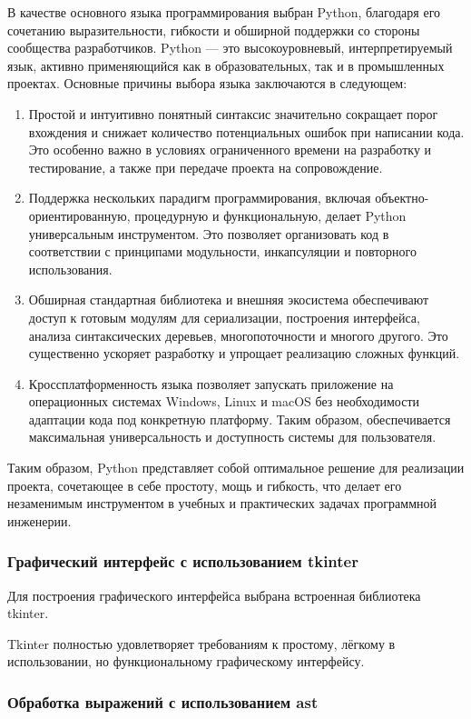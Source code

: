 В качестве основного языка программирования выбран Python, благодаря его сочетанию выразительности, гибкости и обширной поддержки со стороны сообщества разработчиков. Python — это высокоуровневый, интерпретируемый язык, активно применяющийся как в образовательных, так и в промышленных проектах. Основные причины выбора языка заключаются в следующем:
\begin{enumerate}
	\item Простой и интуитивно понятный синтаксис значительно сокращает порог вхождения и снижает количество потенциальных ошибок при написании кода. Это особенно важно в условиях ограниченного времени на разработку и тестирование, а также при передаче проекта на сопровождение.
	\item Поддержка нескольких парадигм программирования, включая объектно-ориентированную, процедурную и функциональную, делает Python универсальным инструментом. Это позволяет организовать код в соответствии с принципами модульности, инкапсуляции и повторного использования.
	\item Обширная стандартная библиотека и внешняя экосистема обеспечивают доступ к готовым модулям для сериализации, построения интерфейса, анализа синтаксических деревьев, многопоточности и многого другого. Это существенно ускоряет разработку и упрощает реализацию сложных функций.
	\item Кроссплатформенность языка позволяет запускать приложение на операционных системах Windows, Linux и macOS без необходимости адаптации кода под конкретную платформу. Таким образом, обеспечивается максимальная универсальность и доступность системы для пользователя.	
\end{enumerate}
Таким образом, Python представляет собой оптимальное решение для реализации проекта, сочетающее в себе простоту, мощь и гибкость, что делает его незаменимым инструментом в учебных и практических задачах программной инженерии.

\subsubsection{Графический интерфейс с использованием tkinter}

Для построения графического интерфейса выбрана встроенная библиотека tkinter.

Tkinter полностью удовлетворяет требованиям к простому, лёгкому в использовании, но функциональному графическому интерфейсу.

\subsubsection{Обработка выражений с использованием ast}

